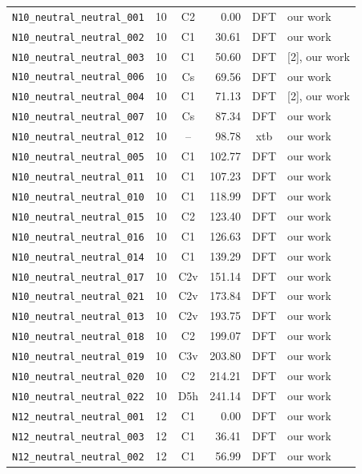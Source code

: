 {\begin{longtable}{@{}p{4.7cm}ccrcp{1.6cm}@{}}
\addlinespace
\texttt{N10\_neutral\_neutral\_001} & 10 & C2 & 0.00 & DFT & our work \\
\texttt{N10\_neutral\_neutral\_002} & 10 & C1 & 30.61 & DFT & our work \\
\texttt{N10\_neutral\_neutral\_003} & 10 & C1 & 50.60 & DFT & [2], our work \\
\texttt{N10\_neutral\_neutral\_006} & 10 & Cs & 69.56 & DFT & our work \\
\texttt{N10\_neutral\_neutral\_004} & 10 & C1 & 71.13 & DFT & [2], our work \\
\texttt{N10\_neutral\_neutral\_007} & 10 & Cs & 87.34 & DFT & our work \\
\texttt{N10\_neutral\_neutral\_012} & 10 & -- & 98.78 & xtb & our work \\
\texttt{N10\_neutral\_neutral\_005} & 10 & C1 & 102.77 & DFT & our work \\
\texttt{N10\_neutral\_neutral\_011} & 10 & C1 & 107.23 & DFT & our work \\
\texttt{N10\_neutral\_neutral\_010} & 10 & C1 & 118.99 & DFT & our work \\
\texttt{N10\_neutral\_neutral\_015} & 10 & C2 & 123.40 & DFT & our work \\
\texttt{N10\_neutral\_neutral\_016} & 10 & C1 & 126.63 & DFT & our work \\
\texttt{N10\_neutral\_neutral\_014} & 10 & C1 & 139.29 & DFT & our work \\
\texttt{N10\_neutral\_neutral\_017} & 10 & C2v & 151.14 & DFT & our work \\
\texttt{N10\_neutral\_neutral\_021} & 10 & C2v & 173.84 & DFT & our work \\
\texttt{N10\_neutral\_neutral\_013} & 10 & C2v & 193.75 & DFT & our work \\
\texttt{N10\_neutral\_neutral\_018} & 10 & C2 & 199.07 & DFT & our work \\
\texttt{N10\_neutral\_neutral\_019} & 10 & C3v & 203.80 & DFT & our work \\
\texttt{N10\_neutral\_neutral\_020} & 10 & C2 & 214.21 & DFT & our work \\
\texttt{N10\_neutral\_neutral\_022} & 10 & D5h & 241.14 & DFT & our work \\
\addlinespace
\texttt{N12\_neutral\_neutral\_001} & 12 & C1 & 0.00 & DFT & our work \\
\texttt{N12\_neutral\_neutral\_003} & 12 & C1 & 36.41 & DFT & our work \\
\texttt{N12\_neutral\_neutral\_002} & 12 & C1 & 56.99 & DFT & our work \\

\end{longtable}}
